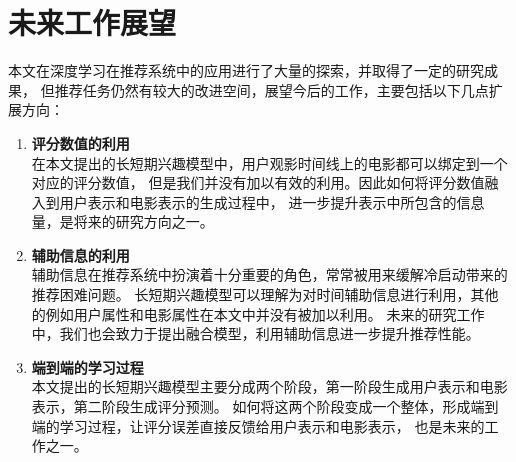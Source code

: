 \section{未来工作展望}
本文在深度学习在推荐系统中的应用进行了大量的探索，并取得了一定的研究成果，
但推荐任务仍然有较大的改进空间，展望今后的工作，主要包括以下几点扩展方向：

\begin{enumerate}
\item \textbf{评分数值的利用}\\
在本文提出的长短期兴趣模型中，用户观影时间线上的电影都可以绑定到一个对应的评分数值，
但是我们并没有加以有效的利用。因此如何将评分数值融入到用户表示和电影表示的生成过程中，
进一步提升表示中所包含的信息量，是将来的研究方向之一。

\item \textbf{辅助信息的利用}\\
辅助信息在推荐系统中扮演着十分重要的角色，常常被用来缓解冷启动带来的推荐困难问题。
长短期兴趣模型可以理解为对时间辅助信息进行利用，其他的例如用户属性和电影属性在本文中并没有被加以利用。
未来的研究工作中，我们也会致力于提出融合模型，利用辅助信息进一步提升推荐性能。

\item \textbf{端到端的学习过程}\\
本文提出的长短期兴趣模型主要分成两个阶段，第一阶段生成用户表示和电影表示，第二阶段生成评分预测。
如何将这两个阶段变成一个整体，形成端到端的学习过程，让评分误差直接反馈给用户表示和电影表示，
也是未来的工作之一。

\end{enumerate}


